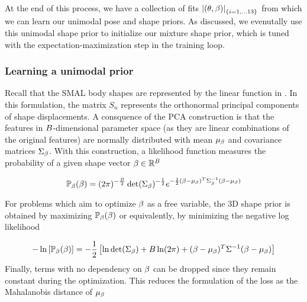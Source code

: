 

At the end of this process, we have a collection of fits $\left|(\theta,\beta)\right|_{\{i=1,...13\}}$ from which we can learn our unimodal pose and shape priors. As discussed, we evenutally use this unimodal shape prior to initialize our mixture shape prior, which is tuned with the expectation-maximization step in the training loop.

\subsubsection{Learning a unimodal prior}

Recall that the SMAL body shapes are represented by the linear function in . In this formulation, the matrix $S_{n}$ represents the orthonormal principal components of shape displacements. A consquence of the PCA construction is that the features in $B$-dimensional parameter space (as they are linear combinations of the original features) are normally distributed with mean $\mu_{\beta}$ and covariance matrices $\Sigma_{\beta}$. With this construction, a likelihood function measures the probability of a given shape vector $\beta \in {\mathbb{R}^{B}}$

\begin{equation}
    \mathbb{P}_{\beta}(\beta) = (2\pi)^{-\frac{B}{2}}\det(\Sigma_{\beta})^{-\frac{1}{2}}e^{-\frac{1}{2}(\beta-\mu_{\beta})^{T}\Sigma_{\beta}^{-1}(\beta-\mu_{\beta})}
\end{equation}

For problems which aim to optimize $\beta$ as a free variable, the 3D shape prior is obtained by maximizing $\mathbb{P}_{\beta}(\beta)$ or equivalently, by minimizing the negative log likelihood

\begin{equation}
     -\ln\left[\mathbb{P}_{\beta}(\beta)\right] = -\frac{1}{2}\left[\ln\det(\Sigma_{\beta}) + B\ln(2\pi) +  (\beta - \mu_{\beta})^T\Sigma^{-1}(\beta-\mu_{\beta})\right]
\end{equation}
Finally, terms with no dependency on $\beta$ can be dropped since they remain constant during the optimization. This reduces the formulation of the loss as the Mahalanobis distance of $\mu_{\beta}$

